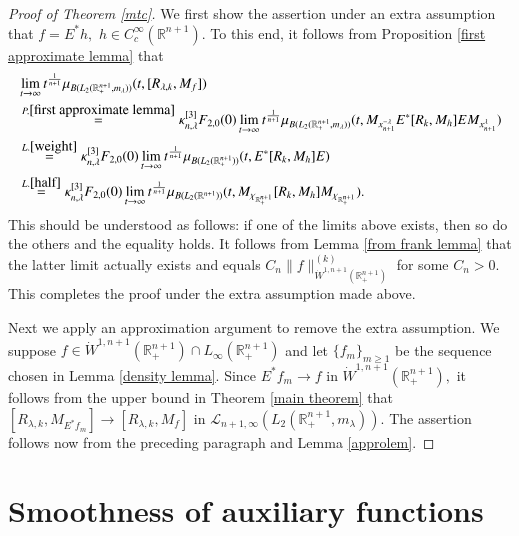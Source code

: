 \documentclass[12pt]{amsart}
\begin{document}
\begin{proof}[Proof of Theorem \ref{mtc}]
We first show the assertion under an extra assumption that $f=E^{\ast}h,$ $h\in C_c^\infty(\mathbb{R}^{n+1}).$ To this end, it follows from Proposition \ref{first approximate lemma} that
\begin{align}\label{spectralasym1}
&\lim_{t\to\infty}t^{\frac1{n+1}}\mu_{B(L_2(\mathbb{R}^{n+1}_+,m_{\lambda}))}(t,[R_{\lambda,k},M_f])\nonumber\\
&\stackrel{P.\ref{first approximate lemma}}{=}\kappa_{n,\lambda}^{[3]}F_{2,0}(0)\lim_{t\to\infty}t^{\frac1{n+1}}\mu_{B(L_2(\mathbb{R}^{n+1}_+,m_{\lambda}))}(t, M_{x_{n+1}^{-\lambda}} E^{\ast}[R_k,M_h]E M_{x_{n+1}^{\lambda}})\nonumber\\
&\stackrel{L.\ref{weight}}{=}\kappa_{n,\lambda}^{[3]}F_{2,0}(0)\lim_{t\to\infty}t^{\frac1{n+1}}\mu_{B(L_2(\mathbb{R}^{n+1}_+))}(t, E^{\ast}[R_k,M_h]E )\nonumber\\
&\stackrel{L.\ref{half}}{=}\kappa_{n,\lambda}^{[3]}F_{2,0}(0)\lim_{t\to\infty}t^{\frac1{n+1}}\mu_{B(L_2(\mathbb{R}^{n+1}))}(t, M_{\chi_{\mathbb{R}^{n+1}_+}}[R_k,M_h]M_{\chi_{\mathbb{R}^{n+1}_+}}).
\end{align}
This should be understood as follows: if one of the limits above exists, then so do the others and the equality holds. It follows from Lemma \ref{from frank lemma} that the latter limit actually exists and equals $C_n\|f\|_{\dot{W}^{1,n+1}(\mathbb{R}_+^{n+1})}^{(k)}$ for some $C_n>0$.  This completes the proof under the extra assumption made above.

Next we apply an approximation argument to remove the extra assumption. We suppose $f\in  \dot{W}^{1,n+1}(\mathbb{R}_+^{n+1})\cap L_{\infty}(\mathbb{R}_+^{n+1})$ and let $\{f_m\}_{m\geq 1}$ be the sequence chosen in Lemma \ref{density lemma}. Since $E^{\ast}f_m\to f$ in $\dot{W}^{1,n+1}(\mathbb{R}^{n+1}_+),$ it follows from the upper bound in Theorem \ref{main theorem} that
$[R_{\lambda,k},M_{E^{\ast}f_m}]\rightarrow [R_{\lambda,k},M_f]$ in $\mathcal{L}_{n+1,\infty}(L_2(\mathbb{R}^{n+1}_+,m_{\lambda})).$ The assertion follows now from the preceding paragraph and Lemma \ref{approlem}.
\end{proof}

\appendix


\section{Smoothness of auxiliary functions}\label{appendix section}
\setcounter{equation}{0}
\end{document}
